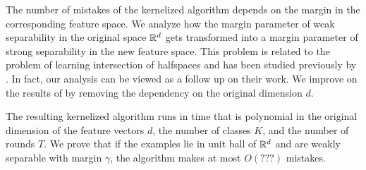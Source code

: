 The number of mistakes of the kernelized algorithm depends on the margin in the
corresponding feature space. We analyze how the margin parameter of weak
separability in the original space $\mathbb{R}^d$ gets transformed into a margin
parameter of strong separability in the new feature space. This problem is
related to the problem of learning intersection of halfspaces and has been
studied previously by \citet{Klivans-Servedio-2008}. In fact, our analysis can
be viewed as a follow up on their work. We improve on the results of
\citet{Klivans-Servedio-2008} by removing the dependency on the original
dimension $d$.

The resulting kernelized algorithm runs in time that is polynomial in the
original dimension of the feature vectors $d$, the number of classes $K$, and
the number of rounds $T$. We prove that if the examples lie in unit ball of
$\mathbb{R}^d$ and are weakly separable with margin $\gamma$, the algorithm makes at
most $O(???)$ mistakes.
